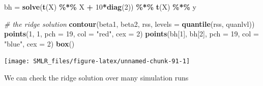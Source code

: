 \documentclass[
]{book}
\newenvironment{Shaded}{\begin{snugshade}}{\end{snugshade}}
\newcommand{\AttributeTok}[1]{\textcolor[rgb]{0.13,0.29,0.53}{#1}}
\newcommand{\CommentTok}[1]{\textcolor[rgb]{0.56,0.35,0.01}{\textit{#1}}}
\newcommand{\DecValTok}[1]{\textcolor[rgb]{0.00,0.00,0.81}{#1}}
\newcommand{\FunctionTok}[1]{\textcolor[rgb]{0.13,0.29,0.53}{\textbf{#1}}}
\newcommand{\NormalTok}[1]{#1}
\newcommand{\OtherTok}[1]{\textcolor[rgb]{0.56,0.35,0.01}{#1}}
\newcommand{\SpecialCharTok}[1]{\textcolor[rgb]{0.81,0.36,0.00}{\textbf{#1}}}
\newcommand{\StringTok}[1]{\textcolor[rgb]{0.31,0.60,0.02}{#1}}
\theoremstyle{definition}
\theoremstyle{definition}
\theoremstyle{definition}
\theoremstyle{definition}
\theoremstyle{remark}
\begin{document}
\begin{Shaded}
\begin{Highlighting}[]
\NormalTok{    bh }\OtherTok{=} \FunctionTok{solve}\NormalTok{(}\FunctionTok{t}\NormalTok{(X) }\SpecialCharTok{\%*\%}\NormalTok{ X }\SpecialCharTok{+} \DecValTok{10}\SpecialCharTok{*}\FunctionTok{diag}\NormalTok{(}\DecValTok{2}\NormalTok{)) }\SpecialCharTok{\%*\%} \FunctionTok{t}\NormalTok{(X) }\SpecialCharTok{\%*\%}\NormalTok{ y}
    
    \CommentTok{\# the ridge solution}
    \FunctionTok{contour}\NormalTok{(beta1, beta2, rss, }\AttributeTok{levels =} \FunctionTok{quantile}\NormalTok{(rss, quanlvl))}
    \FunctionTok{points}\NormalTok{(}\DecValTok{1}\NormalTok{, }\DecValTok{1}\NormalTok{, }\AttributeTok{pch =} \DecValTok{19}\NormalTok{, }\AttributeTok{col =} \StringTok{"red"}\NormalTok{, }\AttributeTok{cex =} \DecValTok{2}\NormalTok{)}
    \FunctionTok{points}\NormalTok{(bh[}\DecValTok{1}\NormalTok{], bh[}\DecValTok{2}\NormalTok{], }\AttributeTok{pch =} \DecValTok{19}\NormalTok{, }\AttributeTok{col =} \StringTok{"blue"}\NormalTok{, }\AttributeTok{cex =} \DecValTok{2}\NormalTok{)}
    \FunctionTok{box}\NormalTok{()}
\end{Highlighting}
\end{Shaded}

\begin{center}\texttt{[image: SMLR\_files/figure-latex/unnamed-chunk-91-1]} \end{center}

We can check the ridge solution over many simulation runs
\end{document}
